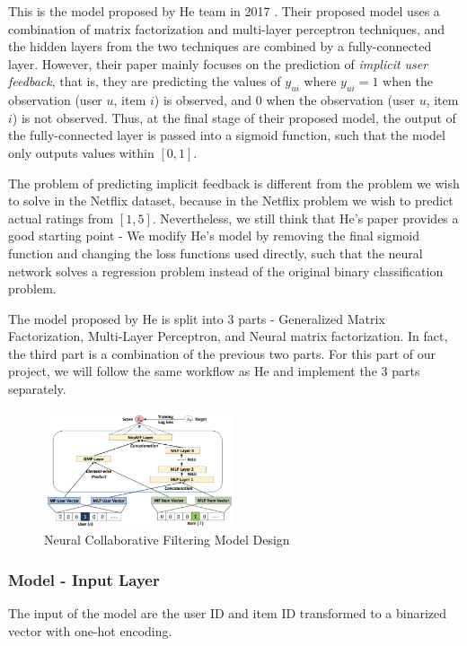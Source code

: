 \documentclass[final]{cvpr}
\begin{document}
This is the model proposed by He team in 2017 \cite{he2017neural}. Their proposed model uses a combination of matrix factorization and multi-layer perceptron techniques, and the hidden layers from the two techniques are combined by a fully-connected layer. However, their paper mainly focuses on the prediction of \textit{implicit user feedback}, that is, they are predicting the values of $y_{ui}$ where $y_{ui}=1$ when the observation (user $u$, item $i$) is observed, and $0$ when the
observation (user $u$, item $i$) is not observed. Thus, at the final stage of their proposed model, the output of the fully-connected layer is passed into a sigmoid function, such that the model only outputs values within $[0, 1]$. 

The problem of predicting implicit feedback is different from the problem we wish to solve in the Netflix dataset, because in the Netflix problem we wish to predict actual ratings from $[1, 5]$.
Nevertheless, we still think that He's paper provides a good starting point - We modify He's model by removing the final sigmoid function and changing the loss functions used directly, such that the neural network solves a regression problem instead of the original binary
classification problem.

The model proposed by He is split into 3 parts - Generalized Matrix Factorization, Multi-Layer Perceptron, and Neural matrix factorization. In fact, the third part is a combination of the previous two parts. For this part of our project, we will follow the same workflow as He and implement the 3 parts separately. 

\begin{figure}[h]
	\includegraphics[width=0.5\textwidth]{./NeuCF.PNG}
	\caption{Neural Collaborative Filtering Model Design \cite{he2017neural}}
\end{figure}

\subsubsection{Model - Input Layer}

The input of the model are the user ID and item ID transformed to a binarized vector with one-hot encoding.
\end{document}

